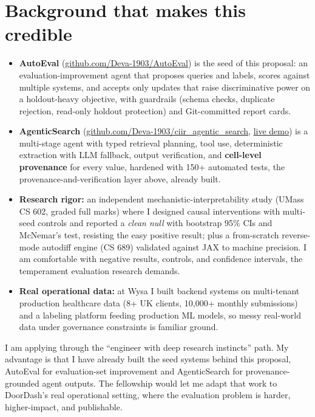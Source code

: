 \documentclass[letterpaper,11pt]{article}
\begin{document}
\section{Background that makes this credible}
\begin{itemize}[leftmargin=1.4em, itemsep=2pt, topsep=2pt]
  \item \textbf{AutoEval} (\href{https://github.com/Deva-1903/AutoEval}{github.com/Deva-1903/AutoEval}) is the seed of this proposal: an evaluation-improvement agent that proposes queries and labels, scores against multiple systems, and accepts only updates that raise discriminative power on a holdout-heavy objective, with guardrails (schema checks, duplicate rejection, read-only holdout protection) and Git-committed report cards.
  \item \textbf{AgenticSearch} (\href{https://github.com/Deva-1903/ciir_agentic_search}{github.com/Deva-1903/ciir\_agentic\_search}, \href{https://agentic-search-negglszkwa-uc.a.run.app}{live demo}) is a multi-stage agent with typed retrieval planning, tool use, deterministic extraction with LLM fallback, output verification, and \textbf{cell-level provenance} for every value, hardened with 150+ automated tests, the provenance-and-verification layer above, already built.
  \item \textbf{Research rigor:} an independent mechanistic-interpretability study (UMass CS 602, graded full marks) where I designed causal interventions with multi-seed controls and reported a \emph{clean null} with bootstrap 95\% CIs and McNemar's test, resisting the easy positive result; plus a from-scratch reverse-mode autodiff engine (CS 689) validated against JAX to machine precision. I am comfortable with negative results, controls, and confidence intervals, the temperament evaluation research demands.
  \item \textbf{Real operational data:} at Wysa I built backend systems on multi-tenant production healthcare data (8+ UK clients, 10,000+ monthly submissions) and a labeling platform feeding production ML models, so messy real-world data under governance constraints is familiar ground.
\end{itemize}

I am applying through the ``engineer with deep research instincts'' path. My advantage is that I have already built the seed systems behind this proposal, AutoEval for evaluation-set improvement and AgenticSearch for provenance-grounded agent outputs. The fellowship would let me adapt that work to DoorDash's real operational setting, where the evaluation problem is harder, higher-impact, and publishable.
\end{document}
